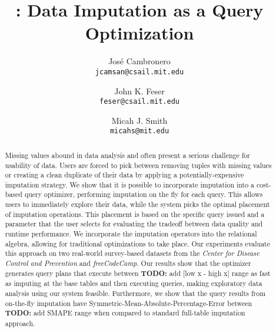 \documentclass{vldb}
\title{\ProjectName{}: Data Imputation as a Query Optimization}
\author{
  Jos\'e Cambronero \\
  \texttt{jcamsan@csail.mit.edu}
  \and
  John K. Feser \\
  \texttt{feser@csail.mit.edu}
  \and
  Micah J. Smith \\
  \texttt{micahs@mit.edu}}
\newcommand{\todo}[1]{{\color{red}\textbf{TODO:} #1}}
\begin{document}
\maketitle

\begin{abstract}
Missing values abound in data analysis and often present a serious challenge for usability of data. Users
are forced to pick between removing tuples with missing values or creating a clean duplicate of their data
by  applying a potentially-expensive imputation strategy. We show that it is possible
to incorporate imputation into a cost-based query optimizer, performing imputation on the fly
for each query. This allows users to immediately explore
their data, while the system picks the optimal placement of imputation operations. This placement is based
on the specific query issued and a parameter that the user selects for evaluating the tradeoff between data
quality and runtime performance. We incorporate the imputation operators into the relational algebra, allowing
for traditional optimizations to take place. Our experiments evaluate this approach on two real-world survey-based datasets
from the \textit{Center for Disease Control and Prevention} and \textit{freeCodeCamp}. Our results show that the optimizer
generates query plans that execute between \todo{add [low x - high x] range} as fast as imputing at the base
tables and then executing queries, making exploratory data analysis using our system feasible. Furthermore, we show that the query results
from on-the-fly imputation have Symmetric-Mean-Absolute-Percentage-Error between \todo{add SMAPE range}  
when compared to standard full-table imputation approach.
\end{abstract}







\balance
\printbibliography
\end{document}
